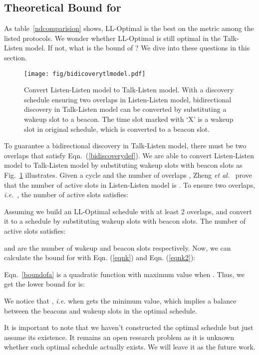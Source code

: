 \documentclass[conference]{IEEEtran}
\begin{document}
\subsection{Theoretical Bound for }
As table~\ref{ndcomparision} shows, LL-Optimal is the best on the  metric among the listed protocols.
We wonder whether LL-Optimal is still optimal in the Talk-Listen model.
If not, what is the bound of ?
We dive into these questions in this section.

\begin{figure}[t]
    \centering
    \texttt{[image: fig/bidicoverytlmodel.pdf]}
    \caption{Convert Listen-Listen model to Talk-Listen model.
    With a discovery schedule ensuring two overlaps in Listen-Listen model, 
    bidirectional discovery in Talk-Listen model can be converted by substituting a wakeup slot to a beacon.
    The time slot marked with `X' is a wakeup slot in original schedule, which is converted to a beacon slot.
}\label{bidicoverytlmodel}
\end{figure}

To guarantee a bidirectional discovery in Talk-Listen model, there must be two overlaps that satisfy Eqn.~(\ref{bidiscoverydef}).
We are able to convert Listen-Listen model to Talk-Listen model by substituting wakeup slots with beacon slots as Fig.~\ref{bidicoverytlmodel} illustrates.
Given a cycle  and the number of overlaps , 
Zheng \emph{et al.}~\cite{zheng2003asynchronous} prove that the number of active slots in Listen-Listen model is .
To ensure two overlaps, \emph{i.e.}\ , the number of active slots satisfies:


Assuming we build an LL-Optimal schedule  with at least 2 overlaps, and convert it to a  schedule by substituting wakeup slots with beacon slots.
The number of active slots  satisfies:

 and  are the number of wakeup and beacon slots respectively.
Now, we can calculate the bound for  with Eqn. (\ref{eqnk}) and Eqn. (\ref{eqnk2}):

Eqn.~\ref{boundofa} is a quadratic function with maximum value  when .
Thus, we get the lower bound for  is:

We notice that , \emph{i.e.}  when  gets the minimum value,
which implies a balance between the beacons and wakeup slots in the optimal schedule.

It is important to note that we haven't constructed the optimal schedule but just assume its existence.
It remains an open research problem as it is unknown whether such optimal schedule actually exists.
We will leave it as the future work.
\end{document}
